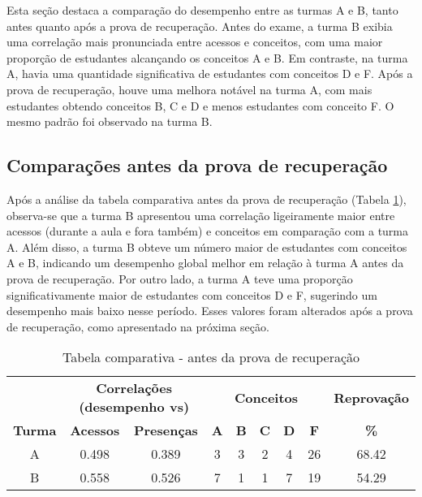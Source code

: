 Esta seção destaca a comparação do desempenho entre as turmas A e B, tanto antes quanto após a prova de recuperação. Antes do exame, a turma B exibia uma correlação mais pronunciada entre acessos e conceitos, com uma maior proporção de estudantes alcançando os conceitos A e B. Em contraste, na turma A, havia uma quantidade significativa de estudantes com conceitos D e F. Após a prova de recuperação, houve uma melhora notável na turma A, com mais estudantes obtendo conceitos B, C e D e menos estudantes com conceito F. O mesmo padrão foi observado na turma B.

\subsection{Comparações antes da prova de recuperação}

Após a análise da tabela comparativa antes da prova de recuperação (Tabela \ref{tab:antes-recuperacao}), observa-se que a turma B apresentou uma correlação ligeiramente maior entre acessos (durante a aula e fora também) e conceitos em comparação com a turma A. Além disso, a turma B obteve um número maior de estudantes com conceitos A e B, indicando um desempenho global melhor em relação à turma A antes da prova de recuperação. Por outro lado, a turma A teve uma proporção significativamente maior de estudantes com conceitos D e F, sugerindo um desempenho mais baixo nesse período. Esses valores foram alterados após a prova de recuperação, como apresentado na próxima seção.

\begin{table}[htbp]
    \centering
    \caption{Tabela comparativa - antes da prova de recuperação}
    \label{tab:antes-recuperacao}
    \begin{tabular}{|c|c|c|c|c|c|c|c|c|}
      \hline
      \rowcolor[HTML]{EFEFEF} 
      & \multicolumn{2}{c|}{\cellcolor[HTML]{C0C0C0}\textbf{Correlações (desempenho vs)}} & \multicolumn{5}{c|}{\cellcolor[HTML]{C0C0C0}\textbf{Conceitos}} & \cellcolor[HTML]{C0C0C0}\textbf{Reprovação} \\
      \cline{2-3} \cline{4-8} \cline{9-9}
      \rowcolor[HTML]{EFEFEF} 
      \textbf{Turma} & \textbf{Acessos} & \textbf{Presenças} & \textbf{A} & \textbf{B} & \textbf{C} & \textbf{D} & \textbf{F} & \textbf{\%} \\
      \hline
      A & 0.498 & 0.389 & 3 & 3 & 2 & 4 & 26 & 68.42 \\
      \hline
      B & 0.558 & 0.526 & 7 & 1 & 1 & 7 & 19 & 54.29 \\
      \hline
    \end{tabular}
\end{table}

